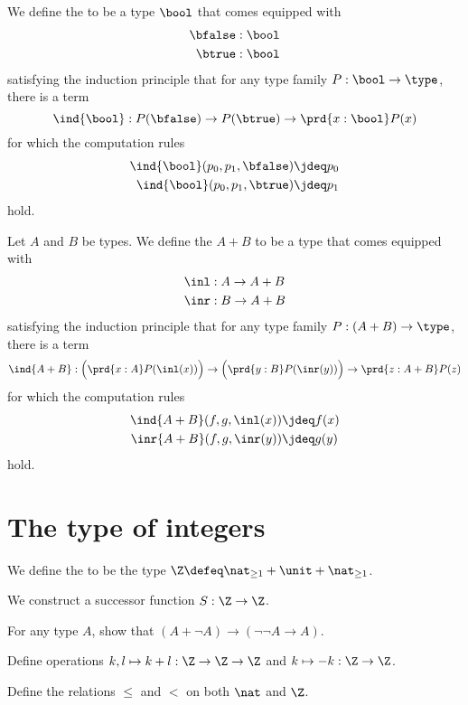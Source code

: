 \begin{defn}
We define the  to be a type $\bool$ that comes equipped with
\begin{align*}
\bfalse & : \bool \\
\btrue & : \bool
\end{align*}
satisfying the induction principle that for any type family $P:\bool\to\type$, there is a term
\begin{equation*}
\ind{\bool} : P(\bfalse)\to P(\btrue)\to \prd{x:\bool}P(x)
\end{equation*}
for which the computation rules
\begin{align*}
\ind{\bool}(p_0,p_1,\bfalse) & \jdeq p_0 \\
\ind{\bool}(p_0,p_1,\btrue) & \jdeq p_1
\end{align*}
hold.
\end{defn}

\begin{defn}
Let $A$ and $B$ be types. We define the  $A+B$ to be a type that comes equipped with
\begin{align*}
\inl & : A \to A+B \\
\inr & : B \to A+B
\end{align*}
satisfying the induction principle that for any type family $P:(A+B)\to\type$, there is a term
\begin{equation*}
\ind{A+B} : \Big(\prd{x:A}P(\inl(x))\Big)\to\Big(\prd{y:B}P(\inr(y))\Big)\to\prd{z:A+B}P(z)
\end{equation*}
for which the computation rules
\begin{align*}
\ind{A+B}(f,g,\inl(x)) & \jdeq f(x) \\
\inr{A+B}(f,g,\inr(y)) & \jdeq g(y)
\end{align*}
hold.
\end{defn}

\section{The type of integers}
\begin{defn}
We define the  to be the type $\Z\defeq\nat_{\geq 1}+\unit+\nat_{\geq 1}$.
\end{defn}

\begin{defn}
We construct a successor function $S:\Z\to\Z$.
\end{defn}

\begin{constr}

\end{constr}

\begin{exercises}
\item For any type $A$, show that $(A+\neg A)\to(\neg\neg A\to A)$. 
\item \label{ex:int_group_ops}Define operations $k,l\mapsto k+l:\Z\to\Z\to\Z$ and $k\mapsto -k:\Z\to \Z$.
\item \label{ex:int_order}Define the relations $\leq$ and $<$ on both $\nat$ and $\Z$.
\end{exercises}
